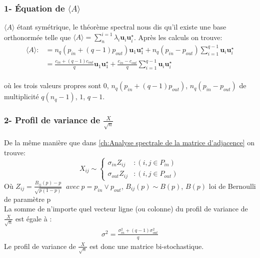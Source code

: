 \subsubsection*{1- Équation de $\langle A \rangle$}
$\langle A \rangle$ étant symétrique, le théorème spectral nous dis qu'il existe une base orthonormée telle que $\langle A \rangle = \sum_{n}^{i=1}\lambda_i\mathbf{u}_i\mathbf{u}_i^{\star}$.
Après les calculs on trouve:
\begin{align} 
\langle A \rangle :&= n_q(p_{in} + (q-1)p_{out}) \mathbf{u}_1\mathbf{u}_1^{\star} + n_q(p_{in}-p_{out})\sum_{i=1}^{q-1}\mathbf{u}_i\mathbf{u}_i^{\star}\\
				   &= \frac{c_{in} + (q-1)c_{out}}{q} \mathbf{u}_1\mathbf{u}_1^{\star} + \frac{c_{in}-c_{out}}{q}\sum_{i=1}^{q-1}\mathbf{u}_i\mathbf{u}_i^{\star}
\end{align}\\
où les trois valeurs propres sont $0$, $n_q(p_{in} + (q-1)p_{out})$, $n_q(p_{in}-p_{out})$ de multiplicité $q(n_q - 1)$, $1$, $q-1$.\\

\subsubsection*{2- Profil de variance de $\frac{X}{\sqrt{n}}$}
De la même manière que dans \autoref{ch:Analyse spectrale de la matrice d'adjacence} on trouve:
\begin{equation}
	X_{ij} \sim \left\{
	\begin{array}{lr}
		\sigma_{in} Z_{ij} & : (i,j \in P_{in}) \\
		\sigma_{out} Z_{ij} & : (i,j \in P_{out})
	\end{array}
\right.\nonumber
\end{equation}
Où $Z_{ij} = \frac{B_{ij}(p) - p}{\sqrt{p(1-p)}} \;\;avec \; p = p_{in} \lor p_{out}$, $B_{ij}(p) \sim B(p)$, $B(p)$ loi de Bernoulli de paramètre p\\
La somme de n'importe quel vecteur ligne (ou colonne) du profil de variance de $\frac{X}{\sqrt{n}}$ est égale à : 
\begin{align}
\label{eq:sigma2} 
\sigma^2 = \frac{\sigma_{in}^2 + (q-1)\sigma_{out}^2}{q}
\end{align}
Le profil de variance de $\frac{X}{\sqrt{n}}$ est donc une matrice bi-stochastique.\\
